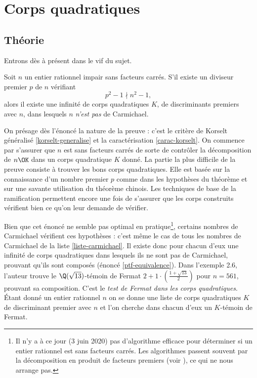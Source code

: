 \section{Corps quadratiques}

\subsection{Théorie}

Entrons dès à présent dans le vif du sujet. 

\begin{theoreme}\label{theoreme-2.5}
	Soit $n$ un entier rationnel impair sans facteurs carrés. S'il existe un diviseur premier $p$ de $n$ vérifiant $$p^2 - 1 \nmid n^2 - 1,$$ alors il existe une infinité de corps quadratiques $K$, de discriminants premiers avec $n$, dans lesquels $n$ \emph{n'est pas} de Carmichael.
\end{theoreme}

\begin{MotSurPreuve}
	On présage dès l'énoncé la nature de la preuve : c'est le critère de Korselt généralisé \ref{korselt-generalise} et la caractérisation \ref{carac-korselt}. On commence par s'assurer que $n$ est sans facteurs carrés de sorte de contrôler la décomposition de $n\OK$ dans un corps quadratique $K$ donné. La partie la plus difficile de la preuve consiste à trouver les bons corps quadratiques. Elle est basée sur la connaissance d'un nombre premier $p$ comme dans les hypothèses du théorème et sur une savante utilisation du théorème chinois. Les techniques de base de la ramification permettent encore une fois de s'assurer que les corps construits vérifient bien ce qu'on leur demande de vérifier. \\
\end{MotSurPreuve}

Bien que cet énoncé ne semble pas optimal en pratique\footnote{Il n'y a à ce jour (3 juin 2020) pas d'algorithme efficace pour déterminer si un entier rationnel est sans facteurs carrés. Les algorithmes passent souvent par la décomposition en produit de facteurs premiers (voir \cite{SquareFree}), ce qui ne nous arrange pas.}, certains nombres de Carmichael vérifient ces hypothèses : c'est même le cas de tous les nombres de Carmichael de la liste \ref{liste-carmichael}. Il existe donc pour chacun d'eux une infinité de corps quadratiques dans lesquels ils ne sont pas de Carmichael, prouvant qu'ils sont composés (énoncé \ref{ptf-equivalence}). Dans l'exemple 2.6, l'auteur trouve le $\Q(\sqrt{13})$-témoin de Fermat $2 + 1\cdot \left(\frac{1 + \sqrt{13}}{2}\right)$ pour $n=561$, prouvant sa composition. C'est le \emph{test de Fermat dans les corps quadratiques}. Étant donné un entier rationnel $n$ on se donne une liste de corps quadratiques $K$ de discriminant premier avec $n$ et l'on cherche dans chacun d'eux un $K$-témoin de Fermat. \\


